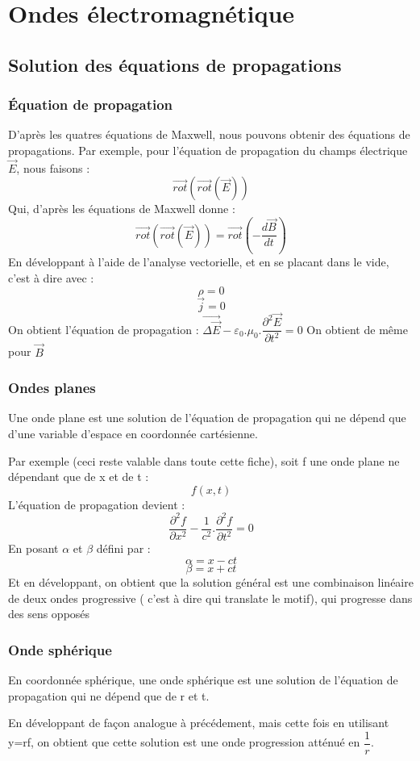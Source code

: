 \chapter{Ondes électromagnétique}
\section{Solution des équations de propagations}
\subsection{Équation de propagation}
D'après les quatres équations de Maxwell, nous pouvons obtenir des équations de propagations. Par exemple, pour l'équation de propagation du champs électrique $\overrightarrow{E}$, nous faisons : 
$$\overrightarrow{rot}(\overrightarrow{rot}(\overrightarrow{E}))$$
Qui, d'après les équations de Maxwell donne : 
$$\overrightarrow{rot}(\overrightarrow{rot}(\overrightarrow{E})) = \overrightarrow{rot}(-\dfrac{d\overrightarrow{B}}{dt})$$
En développant à l'aide de l'analyse vectorielle, et en se placant dans le vide, c'est à dire avec : 
$$\rho = 0$$
$$\overrightarrow{j} = 0$$
On obtient l'équation de propagation : 
$\overrightarrow{\Delta\overrightarrow{E}} - \varepsilon_0.\mu_0.\dfrac{\partial^2 \overrightarrow{E}}{\partial t^2} = 0$
On obtient de même pour $\overrightarrow{B}$
\subsection{Ondes planes}
\begin{de}
Une onde plane est une solution de l'équation de propagation qui ne dépend que d'une variable d'espace en coordonnée cartésienne.
\end{de}
Par exemple (ceci reste valable dans toute cette fiche), soit f une onde plane ne dépendant que de x et de t : 
$$f(x,t)$$
L'équation de propagation devient : 
$$\dfrac{\partial ^2 f}{\partial x^2} - \dfrac{1}{c^2}.\dfrac{\partial^2 f}{\partial t^2} = 0$$
En posant $\alpha$ et $\beta$ défini par : 
$$\alpha = x - ct$$
$$\beta = x + ct$$
Et en développant, on obtient que la solution général est une combinaison linéaire de deux ondes progressive ( c'est à dire qui translate le motif), qui progresse dans des sens opposés
\subsection{Onde sphérique}
\begin{de}
En coordonnée sphérique, une onde sphérique est une solution de l'équation de propagation qui ne dépend que de r et t. 
\end{de}
En développant de façon analogue à précédement, mais cette fois en utilisant y=rf, on obtient que cette solution est une onde progression atténué en $\dfrac{1}{r}$.
